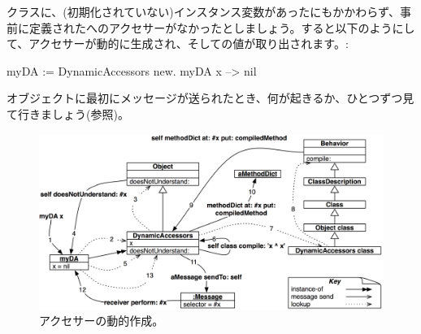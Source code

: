 \documentclass[a4paper,10pt,twoside]{book}
\begin{document}
クラスに、(初期化されていない)インスタンス変数があったにもかかわらず、事前に定義されたへのアクセサーがなかったとしましょう。すると以下のようにして、アクセサーが動的に生成され、そしての値が取り出されます。:
\begin{code}{}
myDA := DynamicAccessors new.
myDA x --> nil
\end{code}

オブジェクトに最初にメッセージが送られたとき、何が起きるか、ひとつずつ見て行きましょう(参照)。

\begin{figure}[ht]\centering
	\includegraphics[width=\linewidth]{DynamicAccessors}
	\caption{アクセサーの動的作成。}
\end{figure}
\end{document}
